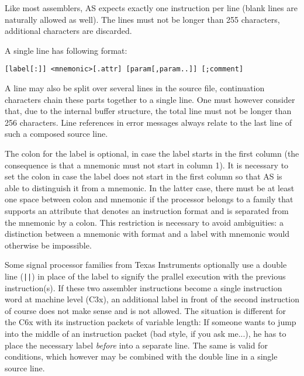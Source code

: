 \documentclass[12pt,twoside]{report}
\begin{document}
Like most assemblers, AS expects exactly one instruction per line
(blank lines are naturally allowed as well).  The lines must not be
longer than 255 characters, additional characters are discarded.

A single line has following format:
\begin{verbatim}
[label[:]] <mnemonic>[.attr] [param[,param..]] [;comment]
\end{verbatim}
A line may also be split over several lines in the source file,
continuation characters chain these parts together to a single line.  One
must however consider that, due to the internal buffer structure, the
total line must not be longer than 256 characters.  Line references in
error messages always relate to the last line of such a composed source
line.
\par
The colon for the label is optional, in case the label starts in the
first column (the consequence is that a mnemonic must not start in
column 1).  It is necessary to set the colon in case the label does
not start in the first column so that AS is able to distinguish it
from a mnemonic.  In the latter case, there must be at least one space
between colon and mnemonic if the processor belongs to a family that
supports an attribute that denotes an instruction format and is
separated from the mnemonic by a colon.  This restriction is
necessary to avoid ambiguities: a distinction between a mnemonic with
format and a label with mnemonic would otherwise be impossible.

Some signal processor families from Texas Instruments optionally use a
double line (\verb!||!) in place of the label to signify the prallel
execution with the previous instruction(s).  If these two assembler
instructions become a single instruction word at machine level (C3x), an
additional label in front of the second instruction of course does not
make sense and is not allowed.  The situation is different for the C6x
with its instruction packets of variable length: If someone wants to jump
into the middle of an instruction packet (bad style, if you ask me...), he
has to place the necessary label {\em before} into a separate line.  The
same is valid for conditions, which however may be combined with the
double line in a single source line.
\end{document}
